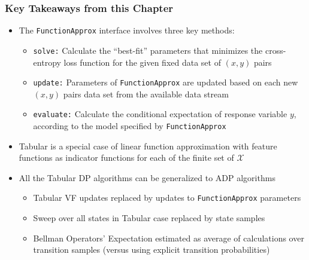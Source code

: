 \documentclass{beamer}
\begin{document}
\begin{frame}
\frametitle{Key Takeaways from this Chapter}
\pause
\begin{itemize}[<+->]
\item The \lstinline{FunctionApprox} interface involves three key methods:
\begin{itemize}
\item \lstinline{solve:} Calculate the ``best-fit'' parameters that minimizes the cross-entropy loss function for the given fixed data set of $(x,y)$ pairs
\item \lstinline{update:} Parameters of \lstinline{FunctionApprox} are updated based on each new $(x,y)$ pairs data set from the available data stream
\item \lstinline{evaluate:}  Calculate the conditional expectation of response variable $y$, according to the model specified by \lstinline{FunctionApprox}
\end{itemize}
\item Tabular is a special case of linear function approximation with feature functions as indicator functions for each of the finite set of $\mathcal{X}$
\item All the Tabular DP algorithms can be generalized to ADP algorithms
\begin{itemize}
\item Tabular VF updates replaced by updates to \lstinline{FunctionApprox} parameters
\item Sweep over all states in Tabular case replaced by state samples
\item Bellman Operators' Expectation estimated as average of calculations over transition samples (versus using explicit transition probabilities)
\end{itemize}
\end{itemize}
\end{frame}
\end{document}
